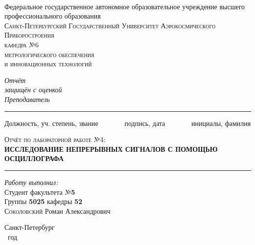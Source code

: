 \newcommand{\HRule}{\rule{\linewidth}{0.5mm}}
\begin{titlepage}
\begin{center}
\textsc{}\\
Федеральное государственное автономное образовательное учреждение
высшего профессионального образования\\[0.5 cm]

\textsc{\large Санкт-Петербургский Государственный
Университет Аэрокосмического Приборостроения}\\[1 cm]
\textsc{\large кафедра №6\\
метрологического обеспечения\\
и инновационных технологий}
\\[2cm]

 \begin{flushleft} \large
  \emph{Отчёт} \\
   \emph{защищён с оценкой}
   \\[0.5cm]
   \emph{Преподаватель}\\[-3mm]
   \HRule
\end{flushleft}
\begin{flushright}
\vspace{-6 pt}
{\small
Должность, уч. степень, звание
\ \ \ \ \ \ \
подпись, дата
\ \ \ \ \ \ \
инициалы, фамилия }\\[10mm]
\end{flushright}

\textsc{\Large Отчёт по лабораторной работе №4:} \\[1cm]
{\Large \bfseries ИССЛЕДОВАНИЕ НЕПРЕРЫВНЫХ СИГНАЛОВ
С ПОМОЩЬЮ ОСЦИЛЛОГРАФА}\\[1cm]

\HRule
\vspace{5 pt}
\begin{flushright}
    \begin{minipage}{0.5\textwidth}
        \begin{flushright} 
            \large
            \emph{Работу выполнил:}\\
            Студент факультета №\textbf{5}\\
            Группы \textbf{5025} кафедры \textbf{52}\\[2pt]
            \textsc{Соколовский} \textsc{Р}оман \textsc{А}лександрович
        \end{flushright}
    \end{minipage}
\end{flushright}

\vfill
Санкт-Петербург\\
\the\year~год
\end{center}
\end{titlepage}
